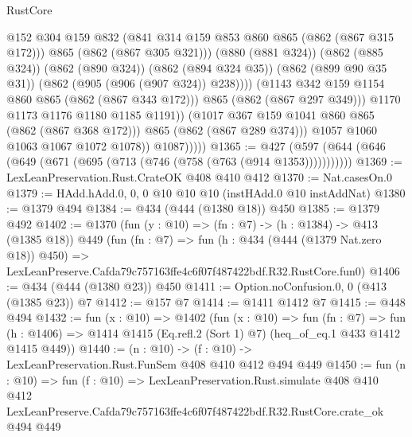 \begin{lexlean}{RustCore}
\begin{coremodule}
                                @152
                                @304
                                @159
                                @832
                                (@841 @314 @159 @853 @860 @865 (@862 (@867 @315 @172)))
                                @865
                                (@862 (@867 @305 @321)))
                              (@880 (@881 @324))
                              (@862 (@885 @324))
                              (@862 (@890 @324))
                              (@862 (@894 @324 @35))
                              (@862 (@899 @90 @35 @31))
                              (@862 (@905 (@906 (@907 @324)) @238))))
                          (@1143 @342 @159 @1154 @860 @865 (@862 (@867 @343 @172)))
                          @865
                          (@862 (@867 @297 @349)))
                        @1170
                        @1173
                        @1176
                        @1180
                        @1185
                        @1191))
                    (@1017 @367 @159 @1041 @860 @865 (@862 (@867 @368 @172)))
                    @865
                    (@862 (@867 @289 @374)))
                  @1057
                  @1060
                  @1063
                  @1067
                  @1072
                  @1078))
              @1087)))))
@1365 := @427 (@597 (@644 (@646 (@649 (@671 (@695 (@713 (@746 (@758 (@763 (@914 @1353)))))))))))
@1369 := LexLeanPreservation.Rust.CrateOK @408 @410 @412
@1370 := Nat.casesOn.{0}
@1379 := HAdd.hAdd.{0, 0, 0} @10 @10 @10 (instHAdd.{0} @10 instAddNat)
@1380 := @1379 @494
@1384 := @434 (@444 (@1380 @18)) @450
@1385 := @1379 @492
@1402 := @1370
    (fun (y : @10) => (fn : @7) -> (h : @1384) -> @413 (@1385 @18))
    @449
    (fun (fn : @7) =>
    fun (h : @434 (@444 (@1379 Nat.zero @18)) @450) =>
    LexLeanPreserve.Cafda79c757163ffe4c6f07f487422bdf.R32.RustCore.fun0)
@1406 := @434 (@444 (@1380 @23)) @450
@1411 := Option.noConfusion.{0, 0} (@413 (@1385 @23)) @7
@1412 := @157 @7
@1414 := @1411 @1412 @7
@1415 := @448 @494
@1432 := fun (x : @10) =>
  @1402
    (fun (x : @10) =>
    fun (fn : @7) =>
    fun (h : @1406) => @1414 @1415 (Eq.refl.{2} (Sort 1) @7) (heq_of_eq.{1} @433 @1412 @1415 @449))
@1440 := (n : @10) -> (f : @10) -> LexLeanPreservation.Rust.FunSem @408 @410 @412 @494 @449
@1450 := fun (n : @10) =>
  fun (f : @10) =>
  LexLeanPreservation.Rust.simulate
    @408
    @410
    @412
    LexLeanPreserve.Cafda79c757163ffe4c6f07f487422bdf.R32.RustCore.crate_ok
    @494
    @449
\end{coremodule}
\end{lexlean}
